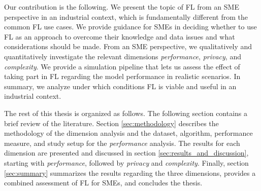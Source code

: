 Our contribution is the following. We present the topic of FL from an SME perspective in an industrial context, which is fundamentally different from the common FL use cases. We provide guidance for SMEs in deciding whether to use FL as an approach to overcome their knowledge and data issues and what considerations should be made.
From an SME perspective, we qualitatively and quantitatively investigate the relevant dimensions \emph{performance}, \emph{privacy}, and \emph{complexity}. We provide a simulation pipeline that lets us assess the effect of taking part in FL regarding the model performance in realistic scenarios. In summary, we analyze under which conditions FL is viable and useful in an industrial context. %

The rest of this thesis is organized as follows. The following section contains a brief review of the literature. Section \ref{sec:methodology} describes the methodology of the dimension analysis and the dataset, algorithm, performance measure, and study setup for the \emph{performance} analysis. The results for each dimension are presented and discussed in section \ref{sec:results_and_discussion}, starting with \emph{performance}, followed by \emph{privacy} and \emph{complexity}. Finally, section \ref{sec:summary} summarizes the results regarding the three dimensions, provides a combined %
assessment of FL for SMEs, and concludes the thesis.
